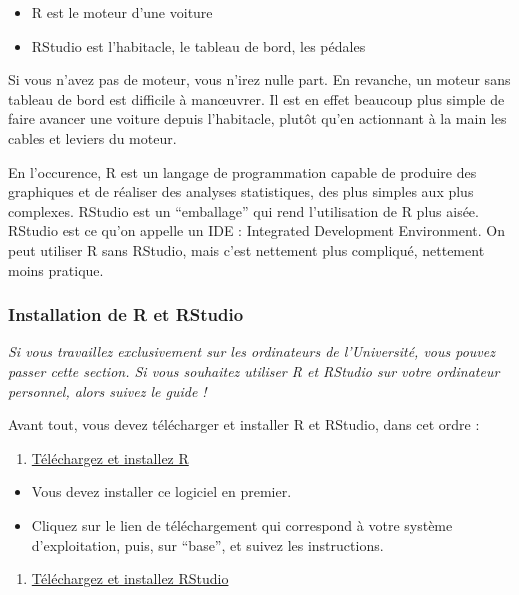 \documentclass[a4paperpaper,]{article}
\providecommand{\tightlist}{%
  \setlength{\itemsep}{0pt}\setlength{\parskip}{0pt}}
\begin{document}
\begin{itemize}
\tightlist
\item
  R est le moteur d'une voiture
\item
  RStudio est l'habitacle, le tableau de bord, les pédales
\end{itemize}

Si vous n'avez pas de moteur, vous n'irez nulle part. En revanche, un moteur sans tableau de bord est difficile à manœuvrer. Il est en effet beaucoup plus simple de faire avancer une voiture depuis l'habitacle, plutôt qu'en actionnant à la main les cables et leviers du moteur.

En l'occurence, R est un langage de programmation capable de produire des graphiques et de réaliser des analyses statistiques, des plus simples aux plus complexes. RStudio est un ``emballage'' qui rend l'utilisation de R plus aisée. RStudio est ce qu'on appelle un IDE : Integrated Development Environment. On peut utiliser R sans RStudio, mais c'est nettement plus compliqué, nettement moins pratique.

\hypertarget{installation-de-r-et-rstudio}{%
\subsubsection{Installation de R et RStudio}\label{installation-de-r-et-rstudio}}

\emph{Si vous travaillez exclusivement sur les ordinateurs de l'Université, vous pouvez passer cette section. Si vous souhaitez utiliser R et RStudio sur votre ordinateur personnel, alors suivez le guide !}

Avant tout, vous devez télécharger et installer R et RStudio, dans cet ordre :

\begin{enumerate}
\def\labelenumi{\arabic{enumi}.}
\tightlist
\item
  \href{https://cran.r-project.org}{Téléchargez et installez R}
\end{enumerate}

\begin{itemize}
\tightlist
\item
  Vous devez installer ce logiciel en premier.
\item
  Cliquez sur le lien de téléchargement qui correspond à votre système d'exploitation, puis, sur ``base'', et suivez les instructions.
\end{itemize}

\begin{enumerate}
\def\labelenumi{\arabic{enumi}.}
\setcounter{enumi}{1}
\tightlist
\item
  \href{https://www.rstudio.com/products/RStudio/\#Desktop}{Téléchargez et installez RStudio}
\end{enumerate}
\end{document}
